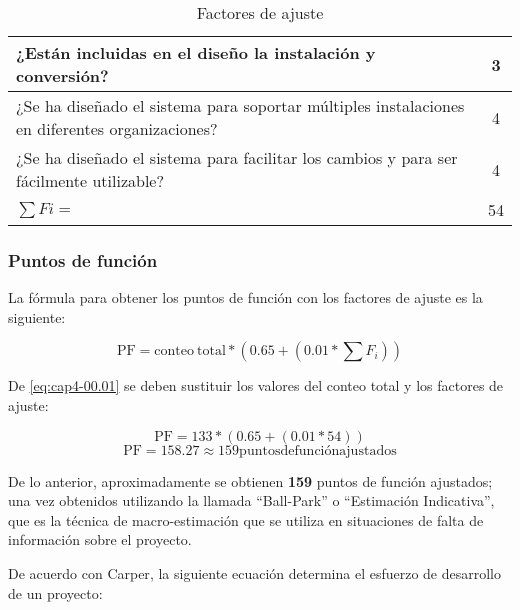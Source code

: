 \begin{table}[H]
\begin{tabular}{|p{9cm}|c|}
		¿Están incluidas en el diseño la instalación y conversión?                                                               & 3           \\ \hline
		¿Se ha diseñado el sistema para soportar múltiples instalaciones en diferentes organizaciones?                           & 4           \\ \hline
		¿Se ha diseñado el sistema para facilitar los cambios y para ser fácilmente utilizable?                                  & 4           \\ \hline
		\centering $\sum Fi=$                                                                                                  	 & 54          \\ \hline
		\end{tabular}
		\caption{Factores de ajuste}
		\label{tab:questions_adjusment}
		\end{table}


\subsubsection*{Puntos de función}

La fórmula para obtener los puntos de función con los factores de ajuste es la siguiente:

\begin{equation} \label{eq:cap4-00.01}
	\mathrm{PF} = \mathrm{conteo\ total} *  (0.65 + (0.01 * \sum F_i))
\end{equation}

De \eqref{eq:cap4-00.01} se deben sustituir los valores del conteo total y los factores de ajuste:

\begin{equation} \label{eq:cap4-00.02}
	\mathrm{PF} =  133 *  (0.65 + (0.01 * 54))
\end{equation}
\begin{equation} \label{eq:cap4-00.03}
	\mathrm{PF} = 158.27 \approx 159 \mathrm{puntos de función ajustados}
\end{equation}


De lo anterior, aproximadamente se obtienen \textbf{159} puntos de función ajustados; una vez obtenidos utilizando la llamada ``Ball-Park'' o ``Estimación Indicativa'', que es la técnica de macro-estimación que se utiliza en situaciones de falta de información sobre el proyecto.


De acuerdo con Carper\cite{abran_applied_2006}, la siguiente ecuación determina el esfuerzo de desarrollo de un proyecto:


